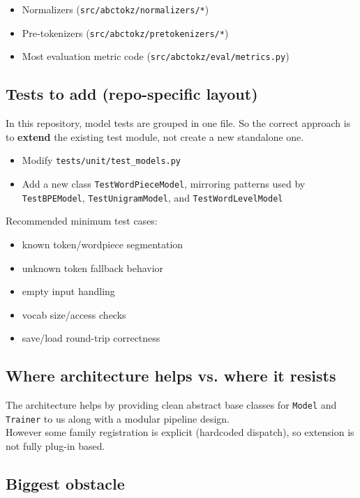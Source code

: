 \documentclass{article}
\begin{document}
\begin{itemize}
    \item Normalizers (\texttt{src/abctokz/normalizers/*})
    \item Pre-tokenizers (\texttt{src/abctokz/pretokenizers/*})
    \item Most evaluation metric code (\texttt{src/abctokz/eval/metrics.py})
\end{itemize}

\subsection{Tests to add (repo-specific layout)}

In this repository, model tests are grouped in one file.  
So the correct approach is to \textbf{extend} the existing test module, not create a new standalone one.

\begin{itemize}
    \item Modify \texttt{tests/unit/test\_models.py}
    \item Add a new class \texttt{TestWordPieceModel}, mirroring patterns used by
    \texttt{TestBPEModel}, \texttt{TestUnigramModel}, and \texttt{TestWordLevelModel}
\end{itemize}

Recommended minimum test cases:
\begin{itemize}
    \item known token/wordpiece segmentation
    \item unknown token fallback behavior
    \item empty input handling
    \item vocab size/access checks
    \item save/load round-trip correctness
\end{itemize}

\subsection{Where architecture helps vs. where it resists}
The architecture helps by providing clean abstract base classes for \texttt{Model} and \texttt{Trainer} to us along with a modular pipeline design. \\
However some family registration is explicit (hardcoded dispatch), so extension is not fully plug-in based.

\subsection{Biggest obstacle}
\end{document}
